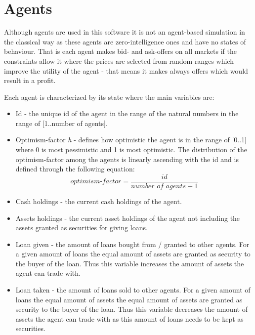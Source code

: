 \documentclass[Bachelorarbeit.tex]{subfiles}
\begin{document}
\section{Agents}
\label{sec:AGENTS}
Although agents are used in this software it is not an agent-based simulation in the classical way as these agents are zero-intelligence ones and have no states of behaviour. That is each agent makes bid- and ask-offers on all markets if the constraints allow it where the prices are selected from random ranges which improve the utility of the agent - that means it makes always offers which would result in a profit.

\medskip

Each agent is characterized by its state where the main variables are:

\begin{itemize}
\item Id - the unique id of the agent in the range of the natural numbers in the range of [1..number of agents].
\item Optimism-factor \textit{h} - defines how optimistic the agent is in the range of [0..1] where 0 is most pessimistic and 1 is most optimistic. The distribution of the optimism-factor among the agents is linearly ascending with the id and is defined through the following equation: 
\begin{equation}
\textit{optimism-factor} = \frac{id}{\textit{number of agents} + 1}
\end{equation}
\item Cash holdings - the current cash holdings of the agent.
\item Assets holdings - the current asset holdings of the agent not including the assets granted as securities for giving loans.
\item Loan given - the amount of loans bought from / granted to other agents. For a given amount of loans the equal amount of assets are granted as security to the buyer of the loan. Thus this variable increases the amount of assets the agent can trade with.
\item Loan taken - the amount of loans sold to other agents. For a given amount of loans the equal amount of assets the equal amount of assets are granted as security to the buyer of the loan. Thus this variable decreases the amount of assets the agent can trade with as this amount of loans needs to be kept as securities.
\end{itemize}

\medskip
\end{document}
